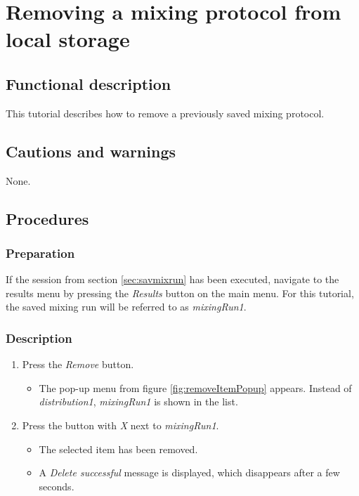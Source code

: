 \section{Removing a mixing protocol from local storage}\label{sec:remmixrun}

\subsection{Functional description}
This tutorial describes how to remove a previously saved mixing protocol.

\subsection{Cautions and warnings}
None.

\subsection{Procedures}

\subsubsection{Preparation}
If the session from section \ref{sec:savmixrun} has been executed, navigate to the results menu by pressing the \emph{Results} button on the main menu.
For this tutorial, the saved mixing run will be referred to as \emph{mixingRun1}.

\subsubsection{Description}
\begin{enumerate}
	\item Press the \emph{Remove} button.
		\begin{itemize}
			\item The pop-up menu from figure \ref{fig:removeItemPopup} appears. Instead of \emph{distribution1}, \emph{mixingRun1} is shown in the list.
		\end{itemize}
	\item Press the button with \emph{X} next to \emph{mixingRun1}.
		\begin{itemize}
			\item The selected item has been removed.
			\item A \emph{Delete successful} message is displayed, which disappears after a few seconds.
		\end{itemize}
\end{enumerate}

